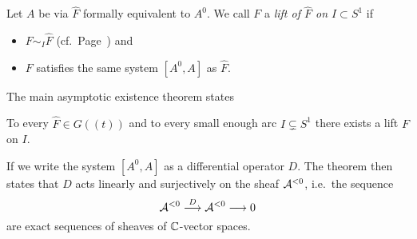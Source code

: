 \begin{defn}\label{defn:lift}
  Let $A$ be via $\hat F$ formally equivalent to $A^0$.
  We call $F$ a \emph{lift of $\hat F$ on $I\subset S^1$} if
  \begin{itemize}
    \item $F\sim_I\hat F$
      (cf.\ Page~\pageref{page:notationForAsymptoticExpansion}) and
    \item $F$ satisfies the same system $[A^0,A]$ as $\hat F$.
  \end{itemize}
\end{defn}
The main asymptotic existence theorem states
\begin{thm}[M.E.A.T]\label{thm:meat}
  To every $\hat F\in G(\!(t)\!)$ and to every small enough arc
  $I\subsetneq S^1$ there exists a lift $F$ on $I$.
  \begin{s-rem}
    If we write the system $[A^0,A]$ as a differential operator $D$.
    The theorem then states that $D$ acts linearly and surjectively on the
    sheaf $\mathcal{A}^{<0}$, i.e.\ the sequence
    \[
      \mathcal{A}^{<0}\overset{D}\longrightarrow\mathcal{A}^{<0} \longrightarrow 0
    \]
    are exact sequences of sheaves of $\mathbb{C}$-vector spaces.
    \begin{comment}
      Proof in \textbf{[Mal91a, App 1; Thm 1]}
    \end{comment}
  \end{s-rem}
\end{thm}
\begin{comment}
  \begin{proof}
    \TODO{}
  \end{proof}
\end{comment}

\begin{comment}
  \begin{rem}
    We are then able to find a \rewrite{(cyclic)} covering of the $S^1$ of
    arcs such that on every arc there exists a lift $\tilde F$ of $\hat F$.
  \end{rem}
\end{comment}
\TODO{}

